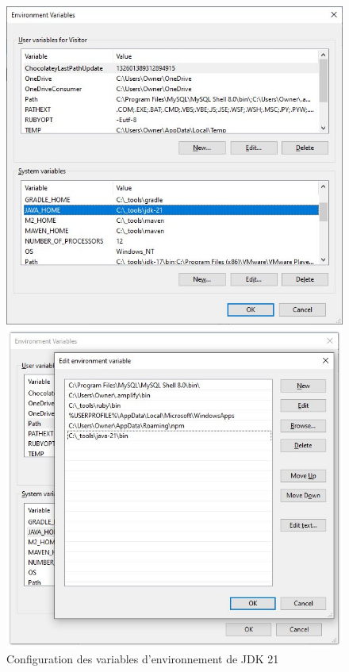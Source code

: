 \documentclass[12pt]{report}
\begin{document}
			\begin{figure}[h]
			    \centering
			    \begin{minipage}[t]{0.48\textwidth}
			        \centering
			        \includegraphics[width=\textwidth]{JAVAHOME.jpg}
			    \end{minipage}\hfill
			    \begin{minipage}[t]{0.48\textwidth}
			        \centering
			        \includegraphics[width=\textwidth]{PATH.jpg}
			    \end{minipage}
			     \caption{Configuration des variables d'environnement de JDK 21}
			     \label{fig:JDKVar}
			\end{figure}
			\FloatBarrier
			
\end{document}
